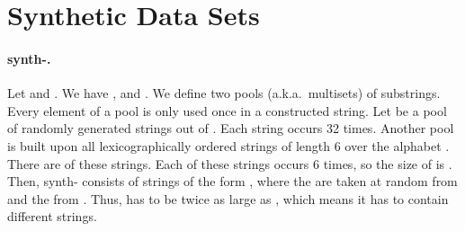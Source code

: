 \documentclass{llncs}
\begin{document}


\appendix
\section{Synthetic Data Sets}
\label{sect:syntheticDatasets}
\paragraph{synth-.}
Let  and . We have ,  and . 
We define two pools (a.k.a.~multisets) of substrings. Every element of a pool is only used once in a constructed string.
Let  be a pool of randomly generated strings out of . Each string occurs 32 times. Another pool  is built upon all lexicographically ordered strings of length 6 over the alphabet . There are  of these strings. Each of these strings occurs 6 times, so the size of  is .
Then, synth- consists of  strings of the form , where the  are taken at random from  and the  from . Thus,  has to be twice as large as , which means it has to contain  different strings.
\end{document}
